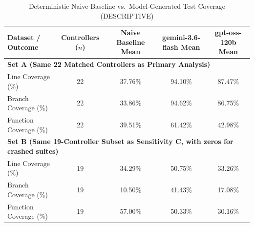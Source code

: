 \begin{table}[t]
\centering
\caption{Deterministic Naive Baseline vs.\ Model-Generated Test Coverage (DESCRIPTIVE)}
\label{tab:naive_baseline}
\begin{tabular}{lcccc}
\toprule
\textbf{Dataset / Outcome} & \textbf{Controllers ($n$)} & \textbf{Naive Baseline Mean} & \textbf{gemini-3.6-flash Mean} & \textbf{gpt-oss-120b Mean} \\
\midrule
\multicolumn{5}{l}{\textbf{Set A (Same 22 Matched Controllers as Primary Analysis)}} \\
\midrule
Line Coverage (\%) & 22 & 37.76\% & 94.10\% & 87.47\% \\
Branch Coverage (\%) & 22 & 33.86\% & 94.62\% & 86.75\% \\
Function Coverage (\%) & 22 & 39.51\% & 61.42\% & 42.98\% \\
\midrule
\multicolumn{5}{l}{\textbf{Set B (Same 19-Controller Subset as Sensitivity C, with zeros for crashed suites)}} \\
\midrule
Line Coverage (\%) & 19 & 34.29\% & 50.75\% & 33.26\% \\
Branch Coverage (\%) & 19 & 10.50\% & 41.43\% & 17.08\% \\
Function Coverage (\%) & 19 & 57.00\% & 50.33\% & 30.16\% \\
\bottomrule
\end{tabular}
\end{table}
